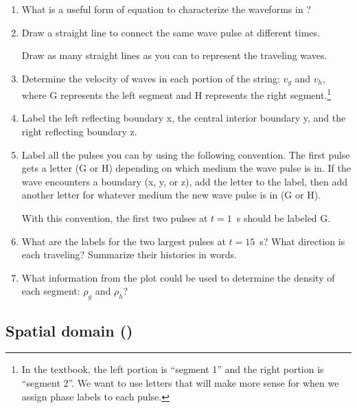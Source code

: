 \documentclass[11pt,titlepage,fleqn]{article}
\begin{document}
\begin{enumerate}
\item What is a useful form of equation to characterize the waveforms in ?

\item Draw a straight line to connect the same wave pulse at different times. 

Draw as many straight lines as you can to represent the traveling waves.

\item Determine the velocity of waves in each portion of the string: $v_g$ and $v_h$, where G represents the left segment and H represents the right segment.\footnote{In the textbook, the left portion is ``segment 1'' and the right portion is ``segment 2''. We want to use letters that will make more sense for when we assign phase labels to each pulse.}

\item Label the left reflecting boundary x, the central interior boundary y, and the right reflecting boundary z.

\item Label all the pulses you can by using the following convention. The first pulse gets a letter (G or H) depending on which medium the wave pulse is in. If the wave encounters a boundary (x, y, or z), add the letter to the label, then add another letter for whatever medium the new wave pulse is in (G or H).

With this convention, the first two pulses at $t=1$~s should be labeled G.

\item What are the labels for the two largest pulses at $t=15$~s? What direction is each traveling? Summarize their histories in words.

\item What information from the plot could be used to determine the density of each segment: $\rho_g$ and $\rho_h$?

\end{enumerate}


\subsection*{Spatial domain ()}
\end{document}
